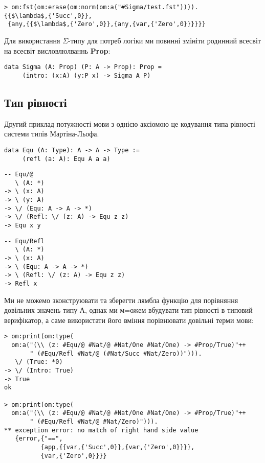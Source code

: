 \documentclass{article}
\begin{document}
\begin{lstlisting}[mathescape=true]
> om:fst(om:erase(om:norm(om:a("#Sigma/test.fst")))).
{{$\lambda$,{'Succ',0}},
 {any,{{$\lambda$,{'Zero',0}},{any,{var,{'Zero',0}}}}}}
\end{lstlisting}

Для використання {\bf $\Sigma$}-типу для потреб логіки ми повинні змініти родинний всесвіт на всесвіт висловлюлваннь {\bf Prop}:

\begin{lstlisting}[mathescape=true]
data Sigma (A: Prop) (P: A -> Prop): Prop =
     (intro: (x:A) (y:P x) -> Sigma A P)
\end{lstlisting}

\subsection{Тип рівності}
Другий приклад потужності мови з однією аксіомою це кодування типа рівності системи типів Мартіна-Льофа.

\begin{lstlisting}
data Equ (A: Type): A -> A -> Type :=
     (refl (a: A): Equ A a a)
\end{lstlisting}

\begin{lstlisting}
-- Equ/@
   \ (A: *)
-> \ (x: A)
-> \ (y: A)
-> \/ (Equ: A -> A -> *)
-> \/ (Refl: \/ (z: A) -> Equ z z)
-> Equ x y
\end{lstlisting}

\begin{lstlisting}
-- Equ/Refl
   \ (A: *)
-> \ (x: A)
-> \ (Equ: A -> A -> *)
-> \ (Refl: \/ (z: A) -> Equ z z)
-> Refl x
\end{lstlisting}

Ми не можемо зконструювати та зберегти лямбла функцію для порівняння довільних значень типу А,
однак ми м=ожем вбудувати тип рівності в типовий верифікатор, а саме використати його вміння порівнювати довільні терми мови:

\begin{lstlisting}[mathescape=true]
> om:print(om:type(
  om:a("(\\ (z: #Equ/@ #Nat/@ #Nat/One #Nat/One) -> #Prop/True)"++
       " (#Equ/Refl #Nat/@ (#Nat/Succ #Nat/Zero))"))).
   \/ (True: *0)
-> \/ (Intro: True)
-> True
ok

> om:print(om:type(
  om:a("(\\ (z: #Equ/@ #Nat/@ #Nat/One #Nat/One) -> #Prop/True)"++
       " (#Equ/Refl #Nat/@ #Nat/Zero)"))).
** exception error: no match of right hand side value
   {error,{"==",
          {app,{{var,{'Succ',0}},{var,{'Zero',0}}}},
          {var,{'Zero',0}}}}
\end{lstlisting}
\end{document}
